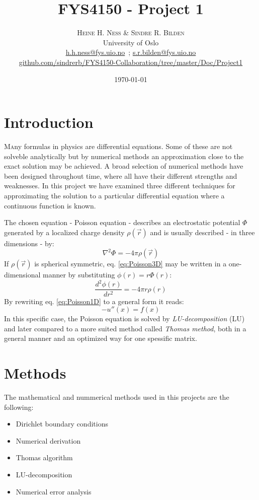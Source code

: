 \documentclass[twoside,twocolumn]{article}
\title{FYS4150 - Project 1} %
\author{%
\textsc{Heine H. Ness \& Sindre R. Bilden} \\[1ex] %
\normalsize University of Oslo \\ %
\normalsize \href{mailto:h.h.ness@fys.uio.no}{h.h.ness@fys.uio.no}\ ; \href{mailto:s.r.bilden@fys.uio.no}{s.r.bilden@fys.uio.no}\\%
\footnotesize \href{https://github.com/sindrerb/FYS4150-Collaboration/tree/master/Doc/Project1}{github.com/sindrerb/FYS4150-Collaboration/tree/master/Doc/Project1}
}
\date{\today} %
\newcommand{\nl}{

\medskip
\noindent
}
\begin{document}
\maketitle


\section{Introduction}

\lettrine[nindent=0em,lines=3]{M}any formulas in physics are differential equations. Some of these are not solveble analytically but by numerical methods an approximation close to the exact solution may be achieved. A broad selection of  numerical methods have been designed throughout time, where all have their different strengths and weaknesses.
In this project we have examined three different techniques for approximating the solution to a particular differential equation where a continuous function is known.\nl 

The chosen equation - Poisson equation - describes an electrostatic potential $\Phi$ generated by a localized charge density $\rho(\vec{r})$ and is usually described - in three dimensions - by:
\begin{equation}
\nabla^2\Phi = -4\pi \rho(\vec{r}) \label{eq:Poisson3D}
\end{equation}
If $\rho(\vec{r})$ is spherical symmetric, eq. \ref{eq:Poisson3D} may be written in a one-dimensional manner by substituting $\phi(r)=r\Phi(r)$:
\begin{equation}
\frac{d^2\phi(r)}{dr^2}=-4\pi r\rho(r) \label{eq:Poisson1D}
\end{equation}
By rewriting eq. \ref{eq:Poisson1D} to a general form it reads:
\begin{equation}
-u''(x)=f(x) \label{eq:general}
\end{equation}
In this specific case, the Poisson equation is solved by \textit{LU-decomposition} (LU) and later compared to a more suited method called \textit{Thomas method}, both in a general manner and an optimized way for one spessific matrix.

\section{Methods}
The mathematical and nummerical methods used in this projects are the following:
\begin{itemize}
\item Dirichlet boundary conditions
\item Numerical derivation
\item Thomas algorithm
\item LU-decomposition
\item Numerical error analysis
\end{itemize}
\end{document}
